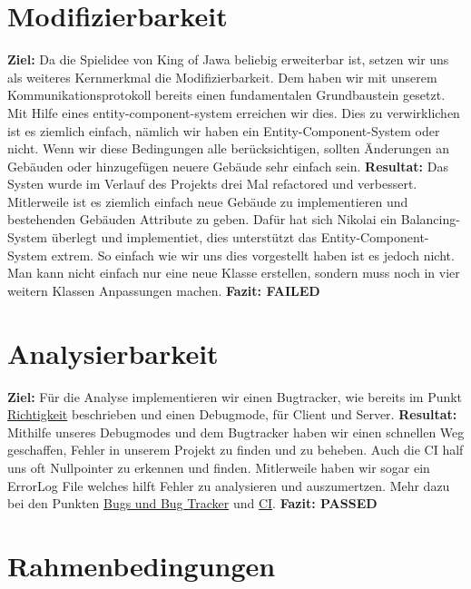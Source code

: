 \documentclass[]{scrartcl}
\newcommand{\n}{\newline}
\begin{document}
\section{Modifizierbarkeit}
\textbf{Ziel:} Da die Spielidee von King of Jawa beliebig erweiterbar ist,  setzen wir uns als weiteres Kernmerkmal die Modifizierbarkeit. Dem haben wir mit unserem Kommunikationsprotokoll bereits  einen fundamentalen Grundbaustein gesetzt. Mit Hilfe eines entity-component-system erreichen wir dies. Dies zu verwirklichen ist es ziemlich einfach, nämlich wir haben ein Entity-Component-System oder nicht. Wenn wir diese Bedingungen alle berücksichtigen, sollten Änderungen an Gebäuden oder hinzugefügen neuere Gebäude sehr einfach sein. \n
\textbf{Resultat:} Das Systen wurde im Verlauf des Projekts drei Mal refactored und verbessert. Mitlerweile ist es ziemlich einfach neue Gebäude zu implementieren und bestehenden Gebäuden Attribute zu geben. Dafür hat sich Nikolai ein Balancing-System überlegt und implementiet, dies unterstützt das Entity-Component-System extrem. So einfach wie wir uns dies vorgestellt haben ist es jedoch nicht. Man kann nicht einfach nur eine neue Klasse erstellen, sondern muss noch in vier weitern Klassen Anpassungen machen. \n
\textbf{Fazit: FAILED}
\section{Analysierbarkeit}
\textbf{Ziel:} Für die Analyse implementieren wir einen Bugtracker, wie bereits im Punkt \hyperref[sec:Richtigkeit]{Richtigkeit} beschrieben und einen Debugmode, für Client und Server.\n
\textbf{Resultat:} Mithilfe unseres Debugmodes und dem Bugtracker haben wir einen schnellen Weg geschaffen, Fehler in unserem Projekt zu finden und zu beheben. Auch die CI half uns oft Nullpointer zu erkennen und finden. Mitlerweile haben wir sogar ein ErrorLog File welches hilft Fehler zu analysieren und auszumertzen. Mehr dazu bei den Punkten \hyperref[ssec:Bugs]{Bugs und Bug Tracker} und \hyperref[ssec:CI]{CI}.\n
\textbf{Fazit: PASSED}

\section{Rahmenbedingungen}
\end{document}
